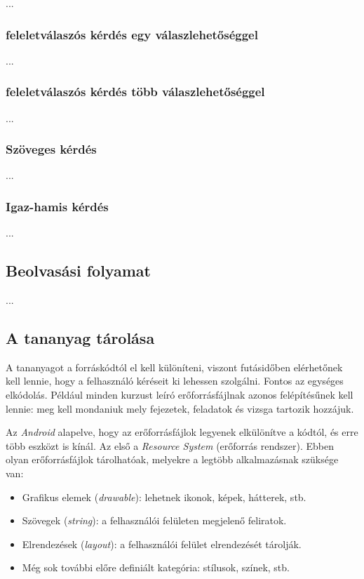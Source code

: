 \documentclass[12pt,a4paper]{article}
\begin{document}
	...
	
	\subsubsection{feleletválaszós kérdés egy válaszlehetőséggel}
	
	...
	
	\subsubsection{feleletválaszós kérdés több válaszlehetőséggel}
	
	...
	
	\subsubsection{Szöveges kérdés}
	
	...
	
	\subsubsection{Igaz-hamis kérdés}
	
	...
	
	\subsection{Beolvasási folyamat}
	
	...
	
	\subsection{A tananyag tárolása}\label{tananyag_tarolasa}
	
	A tananyagot a forráskódtól el kell különíteni, viszont futásidőben elérhetőnek kell lennie, hogy a felhasználó kéréseit ki lehessen szolgálni. Fontos az egységes elkódolás. Például minden kurzust leíró erőforrásfájlnak azonos felépítésűnek kell lennie: meg kell mondaniuk mely fejezetek, feladatok és vizsga tartozik hozzájuk.
	
	Az \textit{Android} alapelve, hogy az erőforrásfájlok legyenek elkülönítve a kódtól, és erre több eszközt is kínál. Az első a \textit{Resource System} (erőforrás rendszer). Ebben olyan erőforrásfájlok tárolhatóak, melyekre a legtöbb alkalmazásnak szüksége van:
	
	\begin{itemize}
		\item Grafikus elemek (\textit{drawable}): lehetnek ikonok, képek, hátterek, stb.
		\item Szövegek (\textit{string}): a felhasználói felületen megjelenő feliratok.
		\item Elrendezések (\textit{layout}): a felhasználói felület elrendezését tárolják.
		\item Még sok további előre definiált kategória: stílusok, színek, stb.
	\end{itemize} 
\end{document}
